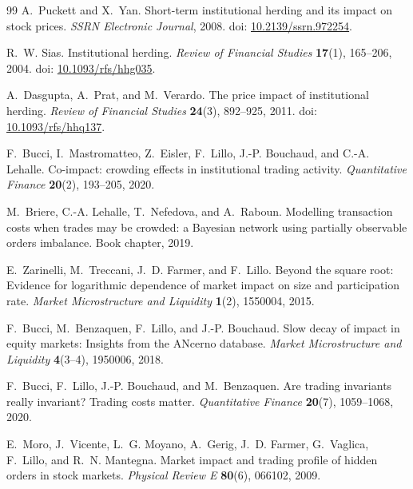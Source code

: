 \documentclass[11pt]{article}
\begin{document}
\begin{thebibliography}{99}
A.~Puckett and X.~Yan.
\newblock Short-term institutional herding and its impact on stock prices.
\newblock \emph{SSRN Electronic Journal}, 2008.
\newblock doi: \href{https://doi.org/10.2139/ssrn.972254}{10.2139/ssrn.972254}.

R.~W. Sias.
\newblock Institutional herding.
\newblock \emph{Review of Financial Studies} \textbf{17}(1), 165--206, 2004.
\newblock doi: \href{https://doi.org/10.1093/rfs/hhg035}{10.1093/rfs/hhg035}.

A.~Dasgupta, A.~Prat, and M.~Verardo.
\newblock The price impact of institutional herding.
\newblock \emph{Review of Financial Studies} \textbf{24}(3), 892--925, 2011.
\newblock doi: \href{https://doi.org/10.1093/rfs/hhq137}{10.1093/rfs/hhq137}.

F.~Bucci, I.~Mastromatteo, Z.~Eisler, F.~Lillo, J.-P. Bouchaud, and C.-A. Lehalle.
\newblock Co-impact: crowding effects in institutional trading activity.
\newblock \emph{Quantitative Finance} \textbf{20}(2), 193--205, 2020.

M.~Briere, C.-A. Lehalle, T.~Nefedova, and A.~Raboun.
\newblock Modelling transaction costs when trades may be crowded: a Bayesian network using partially observable orders imbalance.
\newblock Book chapter, 2019.

E.~Zarinelli, M.~Treccani, J.~D. Farmer, and F.~Lillo.
\newblock Beyond the square root: Evidence for logarithmic dependence of market impact on size and participation rate.
\newblock \emph{Market Microstructure and Liquidity} \textbf{1}(2), 1550004, 2015.

F.~Bucci, M.~Benzaquen, F.~Lillo, and J.-P. Bouchaud.
\newblock Slow decay of impact in equity markets: Insights from the ANcerno database.
\newblock \emph{Market Microstructure and Liquidity} \textbf{4}(3--4), 1950006, 2018.

F.~Bucci, F.~Lillo, J.-P. Bouchaud, and M.~Benzaquen.
\newblock Are trading invariants really invariant? Trading costs matter.
\newblock \emph{Quantitative Finance} \textbf{20}(7), 1059--1068, 2020.

E.~Moro, J.~Vicente, L.~G. Moyano, A.~Gerig, J.~D. Farmer, G.~Vaglica, F.~Lillo, and R.~N. Mantegna.
\newblock Market impact and trading profile of hidden orders in stock markets.
\newblock \emph{Physical Review E} \textbf{80}(6), 066102, 2009.


\end{thebibliography}
\end{document}
